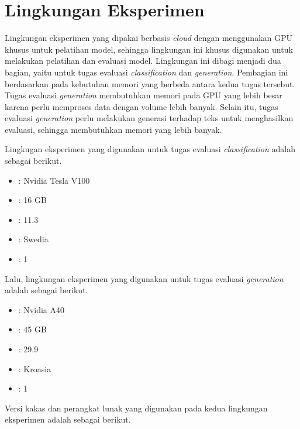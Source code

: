 \section{Lingkungan Eksperimen}
\label{sec:lingkungan-eksperimen}

Lingkungan eksperimen yang dipakai berbasis \textit{cloud} dengan menggunakan GPU khusus untuk pelatihan model, sehingga lingkungan ini khusus digunakan untuk melakukan pelatihan dan evaluasi model. Lingkungan ini dibagi menjadi dua bagian, yaitu untuk tugas evaluasi \textit{classification} dan \textit{generation}. Pembagian ini berdasarkan pada kebutuhan memori yang berbeda antara kedua tugas tersebut. Tugas evaluasi \textit{generation} membutuhkan memori pada GPU yang lebih besar karena perlu memproses data dengan volume lebih banyak. Selain itu, tugas evaluasi \textit{generation} perlu melakukan generasi terhadap teks untuk menghasilkan evaluasi, sehingga membutuhkan memori yang lebih banyak.

Lingkugan eksperimen yang digunakan untuk tugas evaluasi \textit{classification} adalah sebagai berikut.

\begin{itemize}
    \item {} : Nvidia Tesla V100
    \item {} : 16 GB
    \item {} : 11.3
    \item {} : Swedia
    \item {} : 1
\end{itemize}

Lalu, lingkungan eksperimen yang digunakan untuk tugas evaluasi \textit{generation} adalah sebagai berikut.

\begin{itemize}
    \item {} : Nvidia A40
    \item {} : 45 GB
    \item {} : 29.9
    \item {} : Kroasia
    \item {} : 1
\end{itemize}

Versi kakas dan perangkat lunak yang digunakan pada kedua lingkungan eksperimen adalah sebagai berikut.


